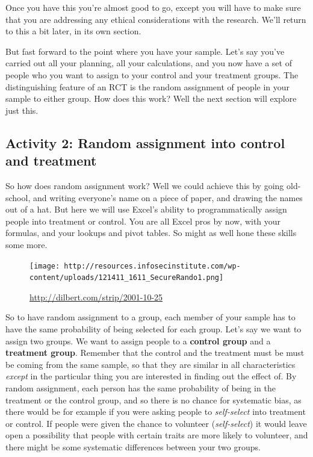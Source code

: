 \documentclass[]{book}
\theoremstyle{definition}
\theoremstyle{definition}
\theoremstyle{definition}
\theoremstyle{remark}
\begin{document}
Once you have this you're almost good to go, except you will have to
make sure that you are addressing any ethical considerations with the
research. We'll return to this a bit later, in its own section.

But fast forward to the point where you have your sample. Let's say
you've carried out all your planning, all your calculations, and you now
have a set of people who you want to assign to your control and your
treatment groups. The distinguishing feature of an RCT is the random
assignment of people in your sample to either group. How does this work?
Well the next section will explore just this.

\hypertarget{activity-2-random-assignment-into-control-and-treatment}{%
\subsection{Activity 2: Random assignment into control and
treatment}\label{activity-2-random-assignment-into-control-and-treatment}}

So how does random assignment work? Well we could achieve this by going
old-school, and writing everyone's name on a piece of paper, and drawing
the names out of a hat. But here we will use Excel's ability to
programmatically assign people into treatment or control. You are all
Excel pros by now, with your formulas, and your lookups and pivot
tables. So might as well hone these skills some more.

\begin{figure}
\centering
\texttt{[image: http://resources.infosecinstitute.com/wp-content/uploads/121411\_1611\_SecureRando1.png]}
\caption{\url{http://dilbert.com/strip/2001-10-25}}
\end{figure}

So to have random assignment to a group, each member of your sample has
to have the same probability of being selected for each group. Let's say
we want to assign two groups. We want to assign people to a
\textbf{control group} and a \textbf{treatment group}. Remember that the
control and the treatment must be must be coming from the same sample,
so that they are similar in all characteristics \emph{except} in the
particular thing you are interested in finding out the effect of. By
random assignment, each person has the same probability of being in the
treatment or the control group, and so there is no chance for systematic
bias, as there would be for example if you were asking people to
\emph{self-select} into treatment or control. If people were given the
chance to volunteer (\emph{self-select}) it would leave open a
possibility that people with certain traits are more likely to
volunteer, and there might be some systematic differences between your
two groups.
\end{document}
